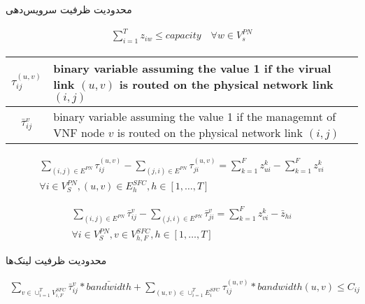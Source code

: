 محدودیت ظرفیت سرویس‌دهی 
\begin{latin}\begin{align}
    \sum_{i=1}^{T} z_{iw} \le capacity
    \quad
    \forall w \in V_{s}^{PN}
\end{align}\end{latin}

\begin{center}\begin{latin}\begin{tabular}{|c|p{10cm}|}
    \hline
    $\tau^{(u,v)}_{ij}$ & binary variable assuming the value 1 if the virual link $(u,v)$ is routed on the physical network link $(i,j)$\\
    \hline
    $\bar{\tau}^{v}_{ij}$ & binary variable assuming the value 1 if the managemnt of VNF node $v$ is routed on the physical network link $(i,j)$\\
    \hline
\end{tabular}\end{latin}\end{center}

\begin{latin}\begin{align}
    \sum_{(i,j) \in E^{PN}} \tau_{ij}^{(u,v)} - \sum_{(j,i) \in E^{PN}} \tau_{ji}^{(u,v)} = \sum_{k=1}^{F} z_{ui}^{k} - \sum_{k=1}^{F} z_{vi}^{k} \nonumber \\
    \forall i \in V_{S}^{PN}, (u,v) \in E_{h}^{SFC}, h \in [1,\ldots, T]
\end{align}\end{latin}
\begin{latin}\begin{align}
    \sum_{(i,j) \in E^{PN}} \bar{\tau}_{ij}^{v} - \sum_{(j,i) \in E^{PN}} \bar{\tau}_{ji}^{v} = \sum_{k=1}^{F} z_{vi}^{k} - \bar{z}_{hi} \nonumber \\
    \forall i \in V_{S}^{PN}, v \in V_{h, F}^{SFC}, h \in [1,\ldots, T]
\end{align}\end{latin}

محدودیت ظرفیت لینک‌ها
\begin{latin}\begin{align}
    \sum_{v \in \cup_{i=1}^{T} V_{i,F}^{SFC}} \bar{\tau}_{ij}^{v} * \bar{bandwidth} + \sum_{(u,v) \in \cup_{i=1}^{T} E_{i}^{SFC}} \tau_{ij}^{(u,v)} * bandwidth(u,v) \le C_{ij}
\end{align}\end{latin}